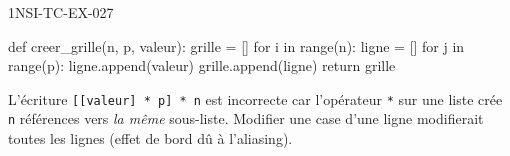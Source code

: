 \begin{corrige}{1NSI-TC-EX-027}
\begin{python}
def creer_grille(n, p, valeur):
    grille = []
    for i in range(n):
        ligne = []
        for j in range(p):
            ligne.append(valeur)
        grille.append(ligne)
    return grille
\end{python}

L'écriture \lstinline{[[valeur] * p] * n} est incorrecte car l'opérateur \lstinline{*} sur une liste crée \lstinline{n} références vers \emph{la même} sous-liste. Modifier une case d'une ligne modifierait toutes les lignes (effet de bord dû à l'aliasing).
\end{corrige}
